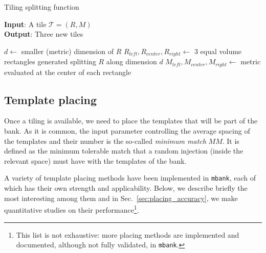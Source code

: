 \documentclass[twocolumn,showpacs,preprintnumbers,nofootinbib,prd,
superscriptaddress,10pt]{revtex4-2}
\begin{document}
\begin{algorithm}[H]
	\centering
	\caption{Tiling splitting function}\label{alg:tiling}
	\flushleft
	\hspace*{\algorithmicindent} \textbf{Input}: A tile $\mathcal{T} = \left(R, M\right)$ \\
	\hspace*{\algorithmicindent} \textbf{Output}: Three new tiles
	\begin{algorithmic}
		\State $d \gets $ smaller (metric) dimension of $R$
		\State $R_{left}, R_{center}, R_{right} \gets $ 3 equal volume rectangles generated splitting $R$ along dimension $d$ 
		\State $M_{left}, M_{center}, M_{right} \gets $ metric evaluated at the center of each rectangle
		\State{}
		\EndProcedure
	\end{algorithmic}
\end{algorithm}


\subsection{Template placing} \label{sec:template_placing}

Once a tiling is available, we need to place the templates that will be part of the bank.
As it is common, the input parameter controlling the average spacing of the templates and their number is the so-called {\it minimum match} $MM$. It is defined as the minimum tolerable match that a random injection (inside the relevant space) must have with the templates of the bank.

A variety of template placing methods have been implemented in \texttt{mbank}, each of which has their own strength and applicability.
Below, we describe briefly the most interesting among them and in Sec.~\ref{sec:placing_accuracy}, we make quantitative studies on their performance\footnote{
This list is not exhaustive: more placing methods are implemented and documented, although not fully validated, in \texttt{mbank}.}.
\end{document}
